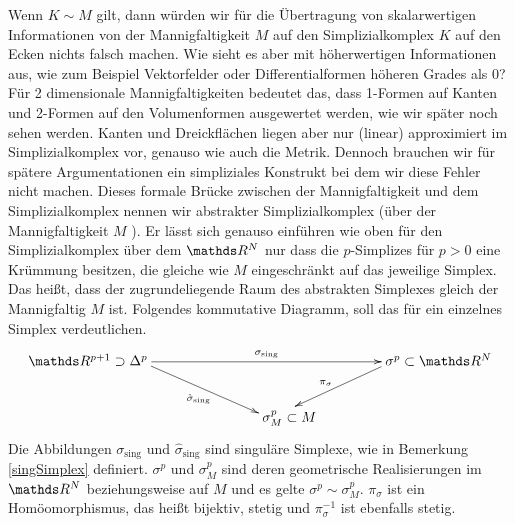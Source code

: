     \begin{bemerkung}
      Wenn \( K \sim M \) gilt, dann würden wir für die Übertragung von skalarwertigen Informationen von der Mannigfaltigkeit
      \( M \) auf den Simplizialkomplex \( K \) auf den Ecken nichts falsch machen.
      Wie sieht es aber mit höherwertigen Informationen aus, wie zum Beispiel Vektorfelder oder Differentialformen höheren Grades als 0? Für 2 dimensionale Mannigfaltigkeiten bedeutet das, dass 1-Formen auf Kanten und 2-Formen auf den Volumenformen ausgewertet werden, wie wir später noch sehen werden. 
      Kanten und Dreickflächen liegen aber nur (linear) approximiert im Simplizialkomplex vor, genauso wie auch die Metrik.
      Dennoch brauchen wir für spätere Argumentationen ein simpliziales Konstrukt bei dem wir diese Fehler nicht machen.
      Dieses formale Brücke zwischen der Mannigfaltigkeit und dem Simplizialkomplex nennen wir abstrakter Simplizialkomplex (über der Mannigfaltigkeit \( M \) ). 
      Er lässt sich genauso einführen wie oben für den Simplizialkomplex über dem \( \R^{N} \) 
      nur dass die \(p\)-Simplizes für \( p > 0 \) eine Krümmung besitzen, die gleiche wie \( M \) eingeschränkt auf das jeweilige Simplex.
      Das heißt, dass der zugrundeliegende Raum des abstrakten Simplexes gleich der Mannigfaltig \( M \) ist.
      Folgendes kommutative Diagramm, soll das für ein einzelnes Simplex verdeutlichen.
      \begin{align}
        \label{diagSingulaerAbstrakt}
        \begin{xy}
          \xymatrix{
            **[l] \R^{p+1} \supset \Delta^{p} \ar[rr]^{\sigma_{\text{sing}}} \ar[rd]_{\hat{\sigma}_{\text{sing}}} 
            & & **[r] \sigma^{p} \subset \R^{N} \ar[ld]_{\pi_{\sigma}} \\
                                       & **[r] \sigma^{p}_{M}\subset M&
          }
        \end{xy}
      \end{align}
      Die Abbildungen \( \sigma_{\text{sing}} \) und \( \hat{\sigma}_{\text{sing}} \) sind singuläre Simplexe, wie in
      Bemerkung \ref{singSimplex} definiert. \( \sigma^{p} \) und \( \sigma^{p}_{M} \) sind deren geometrische Realisierungen im \( \R^{N} \) beziehungsweise auf \( M \)
      und es gelte \( \sigma^{p} \sim \sigma^{p}_{M} \).
      \( \pi_{\sigma} \) ist ein Homöomorphismus, das heißt bijektiv, stetig und \( \pi_{\sigma}^{-1} \) ist ebenfalls stetig. 

\end{bemerkung}
